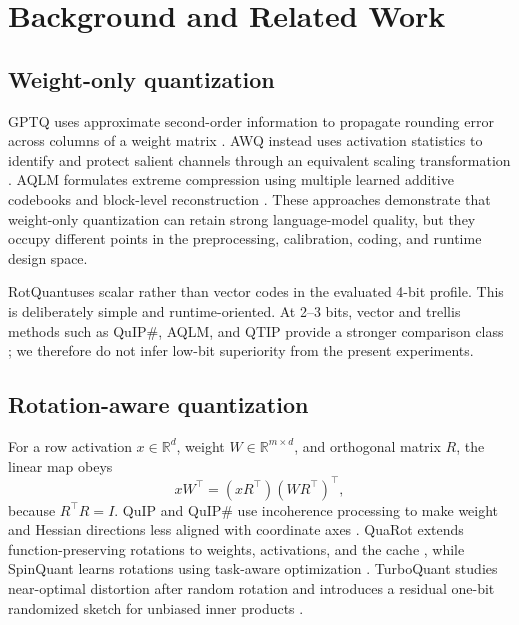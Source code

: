 \documentclass[10pt,twocolumn]{article}
\newcommand{\method}{RotQuant}
\begin{document}
\section{Background and Related Work}

\subsection{Weight-only quantization}

GPTQ uses approximate second-order information to propagate rounding error
across columns of a weight matrix \cite{frantar2022gptq}. AWQ instead uses
activation statistics to identify and protect salient channels through an
equivalent scaling transformation \cite{lin2023awq}. AQLM formulates extreme
compression using multiple learned additive codebooks and block-level
reconstruction \cite{egiazarian2024aqlm}. These approaches demonstrate that
weight-only quantization can retain strong language-model quality, but they
occupy different points in the preprocessing, calibration, coding, and runtime
design space.

\method uses scalar rather than vector codes in the evaluated 4-bit profile.
This is deliberately simple and runtime-oriented. At 2--3 bits, vector and
trellis methods such as QuIP\#, AQLM, and QTIP provide a stronger comparison
class \cite{tseng2024quipsharp,egiazarian2024aqlm,tseng2024qtip}; we therefore
do not infer low-bit superiority from the present experiments.

\subsection{Rotation-aware quantization}

For a row activation $x\in\mathbb{R}^{d}$, weight
$W\in\mathbb{R}^{m\times d}$, and orthogonal matrix $R$, the linear map obeys
\begin{equation}
  xW^{\top} = (xR^{\top})(WR^{\top})^{\top},
  \label{eq:rotation-invariance}
\end{equation}
because $R^{\top}R=I$. QuIP and QuIP\# use incoherence processing to make
weight and Hessian directions less aligned with coordinate axes
\cite{che2023quip,tseng2024quipsharp}. QuaRot extends function-preserving
rotations to weights, activations, and the cache \cite{ashkboos2024quarot},
while SpinQuant learns rotations using task-aware optimization
\cite{liu2024spinquant}. TurboQuant studies near-optimal distortion after random
rotation and introduces a residual one-bit randomized sketch for unbiased inner
products \cite{zandieh2025turboquant}.
\end{document}
